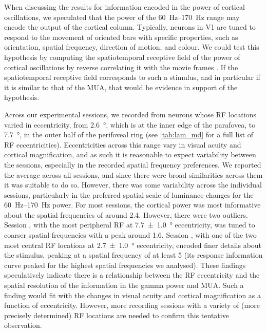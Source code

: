 When discussing the results for information encoded in the power of cortical oscillations, we speculated that the power of the \SIrange{60}{170}{Hz} range may encode the output of the cortical column.
Typically, neurons in \ac{V1} are tuned to respond to the movement of oriented bars with specific properties, such as orientation, spatial frequency, direction of motion, and colour.
We could test this hypothesis by computing the spatiotemporal receptive field of the power of cortical oscillations by reverse correlating it with the movie frames \citep{Theunissen2001}.
If the spatiotemporal receptive field corresponds to such a stimulus, and in particular if it is similar to that of the \ac{MUA}, that would be evidence in support of the hypothesis.

Across our experimental sessions, we recorded from neurons whose \ac{RF} locations varied in eccentricity, from \SI{2.6}{\degree}, which is at the inner edge of the parafovea, to \SI{7.7}{\degree}, in the outer half of the perifoveal ring (see \autoref{tab:lam_md} for a full list of \ac{RF} eccentricities).
Eccentricities across this range vary in visual acuity and cortical magnification, and as such it is reasonable to expect variability between the sessions, especially in the recorded spatial frequency preferences.
We reported the average across all sessions, and since there were broad similarities across them it was suitable to do so.
However, there was some variability across the individual sessions, particularly in the preferred spatial scale of luminance changes for the \SIrange{60}{170}{Hz} power.
For most sessions, the cortical power was most informative about the spatial frequencies of around \SI{2.4}{\cpd}.
However, there were two outliers.
Session , with the most peripheral \ac{RF} at \SI{7.7\pm1.0}{\degree} eccentricity, was tuned to coarser spatial frequencies with a peak around \SI{1.6}{\cpd}.
Session , with one of the two most central \ac{RF} locations at \SI{2.7\pm1.0}{\degree} eccentricity, encoded finer details about the stimulus, peaking at a spatial frequency of at least \SI{5}{\cpd} (its response information curve peaked for the highest spatial frequencies we analysed).
These findings speculatively indicate there is a relationship between the \ac{RF} eccentricity and the spatial resolution of the information in the gamma power and \ac{MUA}.
Such a finding would fit with the changes in visual acuity and cortical magnification as a function of eccentricity.
However, more recording sessions with a variety of (more precisely determined) \ac{RF} locations are needed to confirm this tentative observation.

